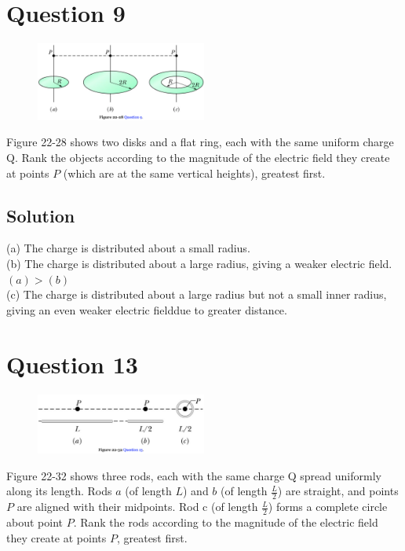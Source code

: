 \documentclass[12pt]{article}
\begin{document}
\pagebreak
\section{Question 9}
\begin{figure}
    \vspace{-30pt}
    \includegraphics[width=0.5\textwidth]{picture_3.png} 
\end{figure}
Figure 22-28 shows two disks and a flat ring, each with the same uniform charge Q. Rank the objects according to the magnitude of the electric field they create at points $P$ (which are at the same vertical heights), greatest first.

\subsection*{Solution}
(a) The charge is distributed about a small radius.\\
(b) The charge is distributed about a large radius, giving a weaker electric field. $(a) > (b)$\\
(c) The charge is distributed about a large radius but not a small inner radius, giving an even weaker electric fielddue to greater distance. 

\pagebreak
\section{Question 13}
\begin{figure}
    \vspace{-30pt}
    \includegraphics[width=0.5\textwidth]{picture_4.png} 
\end{figure}
Figure 22-32 shows three rods, each with the same charge Q spread uniformly along its length. Rods $a$ (of length $L$) and $b$ (of length $\frac{L}{2}$) are straight, and points $P$ are aligned with their midpoints. Rod c (of length $\frac{L}{2}$) forms a complete circle about point $P$. Rank the rods according to the magnitude of the electric field they create at points $P$, greatest first.
\end{document}

